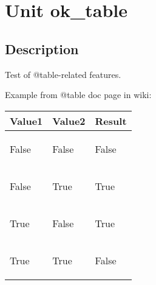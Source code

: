 \documentclass{report}
\begin{document}
\newlength{\tmplength}
\chapter{Unit ok{\_}table}
\section{Description}
Test of @table{-}related features.\hfill\vspace*{1ex}



Example from @table doc page in wiki:



\begin{tabular}{|l|l|l|}
\hline
\textbf{Value1} & \textbf{Value2} & \textbf{Result} \\ \hline
\begin{ttfamily}False\end{ttfamily} & \begin{ttfamily}False\end{ttfamily} & \begin{ttfamily}False\end{ttfamily} \\ \hline
\begin{ttfamily}False\end{ttfamily} & \begin{ttfamily}True\end{ttfamily} & \begin{ttfamily}True\end{ttfamily} \\ \hline
\begin{ttfamily}True\end{ttfamily} & \begin{ttfamily}False\end{ttfamily} & \begin{ttfamily}True\end{ttfamily} \\ \hline
\begin{ttfamily}True\end{ttfamily} & \begin{ttfamily}True\end{ttfamily} & \begin{ttfamily}False\end{ttfamily} \\ \hline
\end{tabular}
\end{document}
